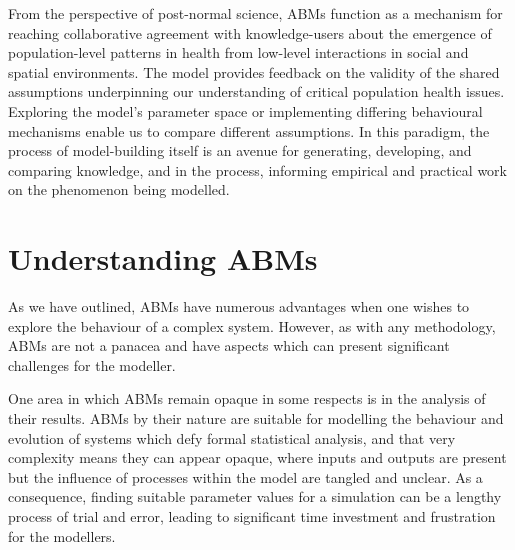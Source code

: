 \documentclass[review]{elsarticle}
\begin{document}

From the perspective of post-normal science, ABMs function as a mechanism for reaching collaborative agreement with knowledge-users about the emergence of population-level patterns in health from low-level interactions in social and spatial environments.  The model provides feedback on the validity of the shared assumptions underpinning our understanding of critical population health issues.  Exploring the model's parameter space or implementing differing behavioural mechanisms enable us to compare different assumptions.  In this paradigm, the process of model-building itself is an avenue for generating, developing, and comparing knowledge, and in the process, informing empirical and practical work on the phenomenon being modelled.


\section{Understanding ABMs}

As we have outlined, ABMs have numerous advantages when one wishes to explore the behaviour of a complex system.  However, as with any methodology, ABMs are not a panacea and have aspects which can present significant challenges for the modeller.

One area in which ABMs remain opaque in some respects is in the analysis of their results.  ABMs by their nature are suitable for modelling the behaviour and evolution of systems which defy formal statistical analysis, and that very complexity means they can appear opaque, where inputs and outputs are present but the influence of processes within the model are tangled and unclear.  As a consequence, finding suitable parameter values for a simulation can be a lengthy process of trial and error, leading to significant time investment and frustration for the modellers.  
\end{document}
